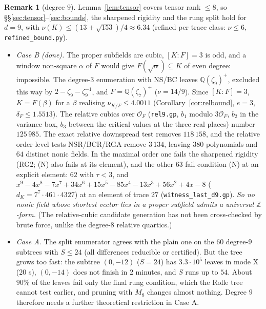 \documentclass[11pt]{amsart}
\theoremstyle{definition}
\newtheorem{remark}[theorem]{Remark}
\newcommand{\Q}{\mathbb{Q}}
\newcommand{\Z}{\mathbb{Z}}
\newcommand{\file}[1]{\texttt{#1}}
\begin{document}
\begin{remark}[degree $9$]
Lemma~\ref{lem:tensor} covers tensor rank $\le8$, so \S\S\ref{sec:tensor}--\ref{sec:bounds},
the sharpened rigidity and the rung split hold for $d=9$, with
$\nu(K)\le(13+\sqrt{153})/4\approx6.34$ (refined per trace class: $\nu\le6$, \file{refined\_bound.py}).
\begin{itemize}[leftmargin=*]
\item \emph{Case B (done).}  The proper subfields are cubic, $[K:F]=3$ is odd, and a window
  non-square $\alpha$ of $F$ would give $F(\sqrt\alpha)\subseteq K$ of even degree: impossible.  The
  degree-$3$ enumeration with NS/BC leaves $\Q(\zeta_9)^+$, excluded this way by
  $2-\zeta_9-\zeta_9^{-1}$, and $F=\Q(\zeta_7)^+$ ($\nu=14/9$).  Since $[K:F]=3$, $K=F(\beta)$ for a
  $\beta$ realising $\nu_{K/F}\le4.0011$ (Corollary~\ref{cor:relbound}, $e=3$, $\delta_F\le1.5513$).
  The relative cubics over $\mathcal O_F$ (\file{rel9.gp}, $b_1$ modulo $3\mathcal O_F$, $b_2$ in the
  variance box, $b_3$ between the critical values at the three real places) number
  $125\,985$.  The exact relative downspread test removes $118\,158$, and the relative
  order-level tests NSR/BCR/RGA remove $3\,134$, leaving $380$ polynomials and $64$ distinct
  nonic fields.  In the maximal order one fails the sharpened rigidity (RG2; (N) also fails
  at its element), and the other $63$ fail condition (N) at an explicit element: $62$ with
  $\tau<3$, and $x^9-4x^8-7x^7+34x^6+15x^5-85x^4-13x^3+56x^2+4x-8$
  ($d_K=7^7\cdot461\cdot4327$) at an element of trace $27$ (\file{witness\_last\_d9.gp}).
  \emph{So no nonic field whose shortest vector lies in a proper subfield admits a universal
  $\Z$-form.}  (The relative-cubic candidate generation has not been cross-checked by brute
  force, unlike the degree-$8$ relative quartics.)
\item \emph{Case A.}  The split enumerator agrees with the plain one on the $60$ degree-$9$
  subtrees with $S\le24$ (all differences reducible or certified).  But the tree grows too
  fast: the subtree $(0,-12)$ ($S=24$) has $3.3\cdot10^5$ leaves in mode X ($20$ s), $(0,-14)$
  does not finish in $2$ minutes, and $S$ runs up to $54$.  About $90\%$ of the leaves fail only
  the final rung condition, which the Rolle tree cannot test earlier, and pruning with $M_8$
  changes almost nothing.  Degree $9$ therefore needs a further theoretical restriction in
  Case A.
\end{itemize}
\end{remark}
\end{document}

